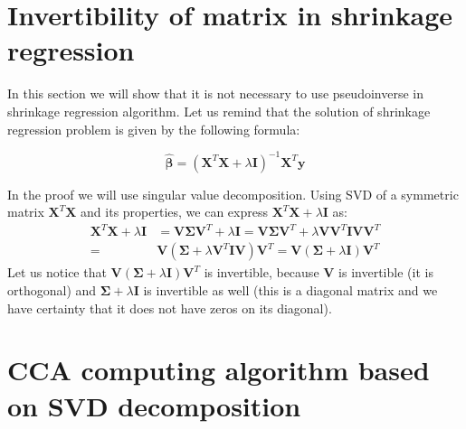 \documentclass[english,a4paper,twoside]{ppfcmthesis}
\begin{document}
\begin{appendices}
\newpage
\section{Invertibility of matrix in shrinkage regression}
\label{app:reg}

In this section we will show that it is not necessary to use pseudoinverse in shrinkage regression algorithm. Let us remind that the solution of shrinkage regression problem is given by the following formula:

\begin{equation}\label{eq:shrink}
    \boldsymbol{\hat{\beta}} = (\boldsymbol{X}^T\boldsymbol{X}+\lambda\boldsymbol{I})^{-1}\boldsymbol{X}^T\boldsymbol{y}
\end{equation}

In the proof we will use singular value decomposition. Using SVD of a symmetric matrix $\boldsymbol{X}^T\boldsymbol{X}$ and its properties, we can express $\boldsymbol{X}^T\boldsymbol{X}+\lambda\boldsymbol{I}$ as: 
\begin{equation}\label{eq:inv_proof}
\begin{split}
    \boldsymbol{X}^T\boldsymbol{X} + \lambda\boldsymbol{I}&=\boldsymbol{V}\boldsymbol{\Sigma}\boldsymbol{V}^T + \lambda\boldsymbol{I} = \boldsymbol{V}\boldsymbol{\Sigma}\boldsymbol{V}^T + \lambda\boldsymbol{V}\boldsymbol{V}^T\boldsymbol{I}\boldsymbol{V}\boldsymbol{V}^T \\ 
    = &\boldsymbol{V}(\boldsymbol{\Sigma} + \lambda\boldsymbol{V}^T\boldsymbol{I}\boldsymbol{V})\boldsymbol{V}^T = \boldsymbol{V}(\boldsymbol{\Sigma} + \lambda\boldsymbol{I})\boldsymbol{V}^T 
\end{split}
\end{equation}
Let us notice that $\boldsymbol{V}(\boldsymbol{\Sigma} + \lambda\boldsymbol{I})\boldsymbol{V}^T$ is invertible, because $\boldsymbol{V}$ is invertible (it is orthogonal) and $\boldsymbol{\Sigma} +\lambda\boldsymbol{I}$ is invertible as well (this is a diagonal matrix and we have certainty that it does not have zeros on its diagonal).

\newpage
\section{CCA computing algorithm based on SVD decomposition}
\label{app:cca}


\end{appendices}
\end{document}
